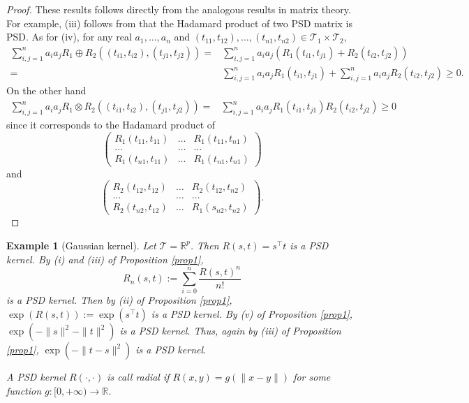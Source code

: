 \documentclass[11pt]{article}
\theoremstyle{plain}
\newtheorem{example}{Example}
\theoremstyle{definition}
\theoremstyle{remark}
\begin{document}
\begin{proof}
    These results follows directly from the analogous results in matrix theory.
    For example, (iii) follows from that the Hadamard product of two PSD matrix is PSD.
    As for (iv), for any real $a_1,\ldots, a_n$ and $(t_{11},t_{12}),\ldots, (t_{n1},t_{n2})\in \mathcal{T}_1\times \mathcal{T}_2$,
\begin{equation*}
    \begin{split}
        \sum_{i,j=1}^n a_i a_j R_1\oplus R_2 ((t_{i1},t_{i2}),(t_{j1},t_{j2}))
    =&
    \sum_{i,j=1}^n a_i a_j 
    \left(R_1 (t_{i1},t_{j1}) + R_2(t_{i2},t_{j2})\right)
    \\
    =&
    \sum_{i,j=1}^n a_i a_j 
    R_1 (t_{i1},t_{j1}) +
    \sum_{i,j=1}^n a_i a_j 
    R_2(t_{i2},t_{j2})
    \geq 0.
    \end{split}
\end{equation*}
On the other hand
\begin{equation*}
    \begin{split}
        \sum_{i,j=1}^n a_i a_j R_1\otimes R_2 ((t_{i1},t_{i2}),(t_{j1},t_{j2}))
    =&
    \sum_{i,j=1}^n a_i a_j 
    R_1 (t_{i1},t_{j1}) R_2(t_{i2},t_{j2})\geq 0
    \end{split}
\end{equation*}
since it corresponds to the Hadamard product of
\begin{equation*}
    \begin{pmatrix}
        R_1(t_{11},t_{11}) & \ldots & R_1(t_{11},t_{n1})\\
        \ldots & \ldots & \ldots\\
        R_1(t_{n1},t_{11}) & \ldots & R_1(t_{n1},t_{n1})
    \end{pmatrix}
\end{equation*}
and 
\begin{equation*}
    \begin{pmatrix}
        R_2(t_{12},t_{12}) & \ldots & R_2(t_{12},t_{n2})\\
        \ldots & \ldots & \ldots\\
        R_2(t_{n2},t_{12}) & \ldots & R_1(s_{n2},t_{n2})
    \end{pmatrix}.
\end{equation*}
\end{proof}

\begin{example}[Gaussian kernel]
    Let $\mathcal{T}=\mathbb{R}^p$.
    Then $R(s,t)=s^\top t$ is a PSD kernel.
    By (i) and (iii) of Proposition \ref{prop1}, 
    \begin{equation*}
        R_n(s,t):=\sum_{i=0}^n \frac{R(s,t)^n}{n!}
    \end{equation*}
    is a PSD kernel.
    Then by (ii) of Proposition \ref{prop1},
    $\exp (R(s,t)):=\exp(s^\top t)$ is a PSD kernel.
    By (v) of Proposition \ref{prop1}, $\exp(-\|s\|^2-\|t\|^2)$ is a PSD kernel.
    Thus, again by (iii) of Proposition \ref{prop1}, $\exp(-\|t-s\|^2)$ is a PSD kernel.

    A PSD kernel $R(\cdot,\cdot)$ is call \emph{radial} if $R(x,y)=g(\|x-y\|)$ for some function $g: [0,+\infty) \to \mathbb R$.
\end{example}
\end{document}
